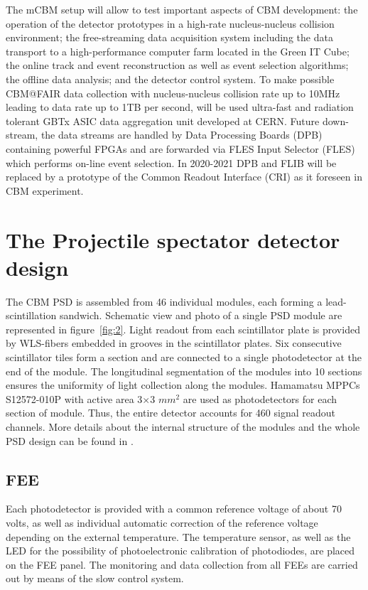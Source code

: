 \documentclass[a4paper,11pt]{article}
\begin{document}
The mCBM setup will allow to test important aspects of CBM development: the operation of the detector prototypes in a high-rate nucleus-nucleus collision environment; the free-streaming data acquisition system including the data transport to a high-performance computer farm located in the Green IT Cube; the online track and event reconstruction as well as event selection algorithms; the offline data analysis; and the detector control system.
To make possible CBM@FAIR data collection with nucleus-nucleus collision rate up to 10MHz leading to data rate up to 1TB per second, will be used ultra-fast and radiation tolerant GBTx ASIC data aggregation unit developed at CERN. Future down-stream, the data streams are handled by Data Processing Boards (DPB) containing powerful FPGAs and are forwarded via FLES Input Selector (FLES) which performs on-line event selection. In 2020-2021 DPB and FLIB will be replaced by a prototype of the Common Readout Interface (CRI) as it foreseen in CBM experiment.\cite{1}



\section{The Projectile spectator detector design}
The CBM PSD is assembled from 46 individual modules, each forming a lead-scintillation sandwich. Schematic view and photo of a single PSD module are represented in figure~\ref{fig:2}. Light readout from each scintillator plate is provided by WLS-fibers embedded in grooves in the scintillator plates. Six consecutive scintillator tiles form a section and are connected to a single photodetector at the end of the module. The longitudinal segmentation of the modules into 10 sections ensures the uniformity of light collection along the modules. Hamamatsu MPPCs S12572-010P with active area 3$\times$3 $mm^2$ are used as photodetectors for each section of module. Thus, the entire detector accounts for 460 signal readout channels. More details about the internal structure of the modules and the whole PSD design can be found in \cite{2}.


\subsection{FEE}
Each photodetector is provided with a common reference voltage of about 70 volts, as well as individual automatic correction of the reference voltage depending on the external temperature. The temperature sensor, as well as the LED for the possibility of photoelectronic calibration of photodiodes, are placed on the FEE panel. The monitoring and data collection from all FEEs are carried out by means of the slow control system.
\end{document}
